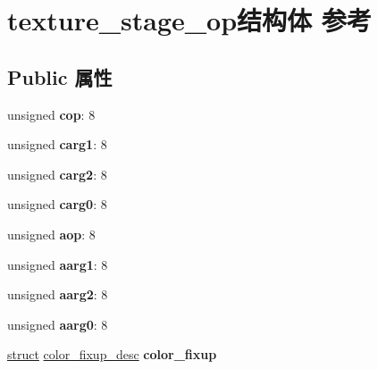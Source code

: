 \hypertarget{structtexture__stage__op}{}\section{texture\+\_\+stage\+\_\+op结构体 参考}
\label{structtexture__stage__op}
\subsection*{Public 属性}
\begin{DoxyCompactItemize}
\item 
\mbox{\label{structtexture__stage__op_a50847723d9d5dca42d9e4b484c407f8e}} 
unsigned {\bfseries cop}\+: 8
\item 
\mbox{\label{structtexture__stage__op_ad5a04684fe41ab31a7176b8fd5fb5532}} 
unsigned {\bfseries carg1}\+: 8
\item 
\mbox{\label{structtexture__stage__op_ae935edba0a65dc03ae3d96843db1af06}} 
unsigned {\bfseries carg2}\+: 8
\item 
\mbox{\label{structtexture__stage__op_a2d462e6b48a3c8688a2d89f4693f6fad}} 
unsigned {\bfseries carg0}\+: 8
\item 
\mbox{\label{structtexture__stage__op_abc91aa7eaf19b75dfecb4abb2a42403e}} 
unsigned {\bfseries aop}\+: 8
\item 
\mbox{\label{structtexture__stage__op_a3bd6548c48836e54a5b1271fc3d7d3f7}} 
unsigned {\bfseries aarg1}\+: 8
\item 
\mbox{\label{structtexture__stage__op_a0cfc19254907581920cb62ef10dcbba8}} 
unsigned {\bfseries aarg2}\+: 8
\item 
\mbox{\label{structtexture__stage__op_a9e21b23dd57d27551a38df1670329b7f}} 
unsigned {\bfseries aarg0}\+: 8
\item 
\mbox{\label{structtexture__stage__op_a943d773fd5997f99e7fc1ef2b2695419}} 
\hyperlink{interfacestruct}{struct} \hyperlink{structcolor__fixup__desc}{color\+\_\+fixup\+\_\+desc} {\bfseries color\+\_\+fixup}

\end{DoxyCompactItemize}
